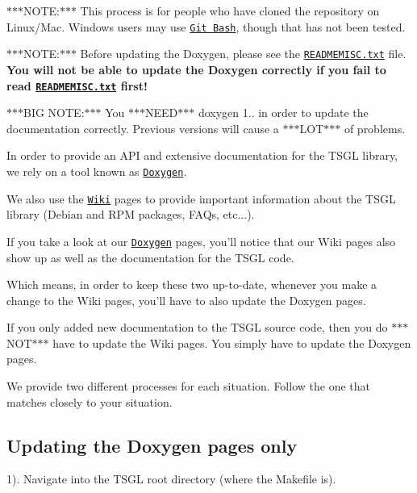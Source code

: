 $\ast$$\ast$$\ast$\-N\-O\-T\-E\-:$\ast$$\ast$$\ast$ This process is for people who have cloned the repository on Linux/\-Mac. Windows users may use \href{https://git-scm.com/download/win}{\tt Git Bash}, though that has not been tested.

$\ast$$\ast$$\ast$\-N\-O\-T\-E\-:$\ast$$\ast$$\ast$ Before updating the Doxygen, please see the \href{https://github.com/Calvin-CS/TSGL/blob/master/READMEMISC.txt}{\tt R\-E\-A\-D\-M\-E\-M\-I\-S\-C.\-txt} file. {\bfseries You will not be able to update the Doxygen correctly if you fail to read \href{https://github.com/Calvin-CS/TSGL/blob/master/READMEMISC.txt}{\tt R\-E\-A\-D\-M\-E\-M\-I\-S\-C.\-txt} first!}

$\ast$$\ast$$\ast$\-B\-I\-G N\-O\-T\-E\-:$\ast$$\ast$$\ast$ You $\ast$$\ast$$\ast$\-N\-E\-E\-D$\ast$$\ast$$\ast$ doxygen 1.. in order to update the documentation correctly. Previous versions will cause a $\ast$$\ast$$\ast$\-L\-O\-T$\ast$$\ast$$\ast$ of problems.

In order to provide an A\-P\-I and extensive documentation for the T\-S\-G\-L library, we rely on a tool known as \href{http://www.stack.nl/~dimitri/doxygen/}{\tt Doxygen}.

We also use the \href{https://github.com/Calvin-CS/TSGL/wiki}{\tt Wiki} pages to provide important information about the T\-S\-G\-L library (Debian and R\-P\-M packages, F\-A\-Qs, etc...).

If you take a look at our \href{http://calvin-cs.github.io/TSGL/html/pages.html}{\tt Doxygen} pages, you'll notice that our Wiki pages also show up as well as the documentation for the T\-S\-G\-L code.

Which means, in order to keep these two up-\/to-\/date, whenever you make a change to the Wiki pages, you'll have to also update the Doxygen pages.

If you only added new documentation to the T\-S\-G\-L source code, then you do $\ast$$\ast$$\ast$\-N\-O\-T$\ast$$\ast$$\ast$ have to update the Wiki pages. You simply have to update the Doxygen pages.

We provide two different processes for each situation. Follow the one that matches closely to your situation.

\subsection*{Updating the Doxygen pages only}

1). Navigate into the T\-S\-G\-L root directory (where the Makefile is).


